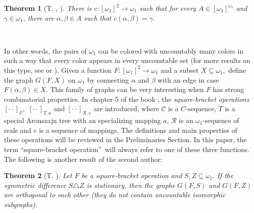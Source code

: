 \documentclass{article}
\newtheorem{theorem}{Theorem}
\begin{document}
\begin{theorem}
[T. \cite{Walks}, \cite{PartitioningPairs}]There is $c:\left[  \omega
_{1}\right]  ^{2}\longrightarrow\omega_{1}$ such that for every\newline%
$A\in\left[  \omega_{1}\right]  ^{\omega_{1}}$ and $\gamma\in\omega_{1}$,
there are $\alpha,\beta\in A$ such that $c\left(  \alpha,\beta\right)
=\gamma.$ \label{Falla Ramsey}
\end{theorem}

\qquad\qquad\qquad\ \ \qquad\ \ \ \ \qquad\ \ \ \ \ \ \ \ \ 

In other words, the pairs of $\omega_{1}$ can be colored with uncountably many
colors in such a way that every color appears in every uncountable set (for
more results on this type, see \cite{Lspace} or
\cite{RectangularSquareBracket}). Given a function $F:\left[  \omega
_{1}\right]  ^{2}\longrightarrow\omega_{1}$ and a subset $X\subseteq\omega
_{1},$ define the graph $G\left(  F,X\right)  $ on $\omega_{1}$ by connecting
$\alpha$ and $\beta$ with an edge in case $F\left(  \alpha,\beta\right)  \in
X.$ This family of graphs can be very interesting when $F$ has strong
combinatorial properties. In chapter 5 of the book \cite{Walks}, the
\emph{square-bracket operations} $[\cdot\cdot]_{\mathcal{C}},$ $[\cdot
\cdot]_{T,a}$ and $[\cdot\cdot]_{\mathcal{R},e}$ are introduced, where
$\mathcal{C}$ is a $C$-sequence, $T$ is a special Aronszajn tree with an
specializing mapping $a$, $\mathcal{R}$ is an $\omega_{1}$-sequence of reals
and $e$ is a sequence of mappings. The definitions and main properties of
these operations will be reviewed in the Preliminaries Section. In this paper,
the term \textquotedblleft square-bracket operation\textquotedblright\ will
always refer to one of these three functions. The following is another result
of the second author:

\begin{theorem}
[T. \cite{Walks}]Let $F$ be a square-bracket operation and $S,Z\subseteq
\omega_{1}.$ If the symmetric difference $S\triangle Z$ is stationary, then
the graphs $G\left(  F,S\right)  $ and $G\left(  F,Z\right)  $ are orthogonal
to each other (they do not contain uncountable isomorphic subgraphs).
\end{theorem}

\qquad\qquad\ \qquad\ \ 
\end{document}
